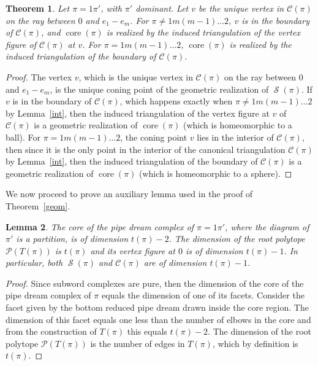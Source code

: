 \documentclass[10pt]{amsart}
\newtheorem{theo}{Theorem}[section]
\newtheorem{lemm}[theo]{Lemma}
\theoremstyle{definition}
\numberwithin{equation}{section}
\DeclareMathOperator{\core}{core}
\newcommand*\C{{\mathcal{C}}}
\renewcommand*\P{{\mathcal{P}}}
\newcommand*\+{\smash{\lower2pt\hbox{\rlap{\vrule height14pt}}\raise2pt\hbox{\rlap{\hskip-3pt \vrule height.4pt depth0pt width14.7pt}}}}
\DeclareMathOperator{\Scal}{\mathcal{S}}
\begin{document}
\begin{theo}\label{thm:core}
Let $\pi=1\pi'$, with $\pi'$ dominant. Let $v$ be the unique vertex in $\C(\pi)$ on the ray between $0$ and $e_1-e_m$. For $\pi \neq 1 m (m-1)\dots 2$, $v$ is in the boundary of $\C(\pi)$, and $\core(\pi)$
is realized by the induced triangulation of the vertex figure of $\C(\pi)$ at $v$. For $\pi=1 m (m-1)\dots 2$, $\core(\pi)$ is realized by the induced triangulation of the boundary of $\C(\pi)$.
\end{theo}

\begin{proof} The vertex $v$, which is the unique vertex in $\C(\pi)$ on the ray between $0$ and $e_1-e_m$, is the unique coning point of the geometric realization of $\Scal(\pi)$. If $v$ is in the boundary of $\C(\pi)$, which happens exactly when $\pi \neq 1 m (m-1)\dots 2$ by Lemma~\ref{int}, then the induced triangulation of the vertex figure at $v$ of $\C(\pi)$ is a geometric realization of $\core(\pi)$ (which is homeomorphic to a ball). For $\pi=1 m (m-1)\dots 2$, the coning point $v$ lies in the interior of $\C(\pi)$, then since it is the only point in the interior of the canonical triangulation $\C(\pi)$ by Lemma~\ref{int}, then the induced triangulation of the boundary of $\C(\pi)$ is a geometric realization of $\core(\pi)$ (which is homeomorphic to a sphere).
\end{proof}

We now proceed to prove an auxiliary lemma used in the proof of Theorem~\ref{geom}.

\begin{lemm}\label{dim}
The core of the pipe dream complex of $\pi=1\pi'$, where the diagram of $\pi'$ is a partition, is of dimension $t(\pi)-2$. The dimension of the root polytope $\P(T(\pi))$ is $t(\pi)$ and its vertex figure at $0$ is of dimension $t(\pi)-1$. In particular, both $\Scal(\pi)$ and $\C(\pi)$ are of dimension $t(\pi)-1$. 
\end{lemm}

\begin{proof} Since subword complexes are pure, then the dimension of the core of the pipe dream complex of $\pi$ equals the dimension of one of its facets. Consider the facet given by the bottom reduced pipe dream drawn inside the core region. The dimension of this facet equals one less than the number of elbows in the core and from the construction of $T(\pi)$ this equals $t(\pi)-2$. The dimension of the root polytope $\P(T(\pi))$ is the number of edges in $T(\pi)$, which by definition is $t(\pi)$.
\end{proof}
\end{document}
